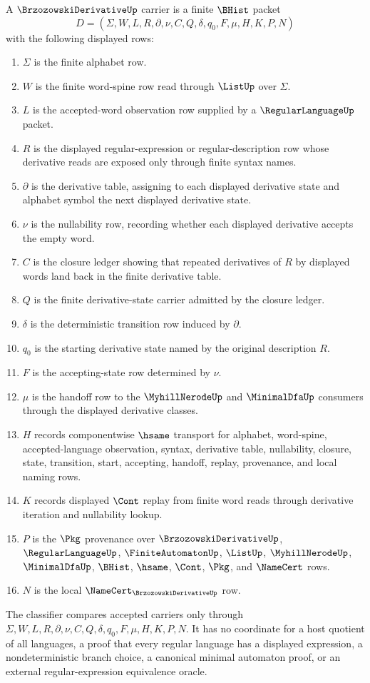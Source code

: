 \begin{definition}
\label{def:brzozowski-derivative-carrier}
A $\BrzozowskiDerivativeUp$ carrier is a finite $\BHist$ packet
$$
D=(\Sigma,W,L,R,\partial,\nu,C,Q,\delta,q_0,F,\mu,H,K,P,N)
$$
with the following displayed rows:
\begin{enumerate}
\item $\Sigma$ is the finite alphabet row.
\item $W$ is the finite word-spine row read through $\ListUp$ over $\Sigma$.
\item $L$ is the accepted-word observation row supplied by a $\RegularLanguageUp$ packet.
\item $R$ is the displayed regular-expression or regular-description row whose derivative reads are exposed only through finite syntax names.
\item $\partial$ is the derivative table, assigning to each displayed derivative state and alphabet symbol the next displayed derivative state.
\item $\nu$ is the nullability row, recording whether each displayed derivative accepts the empty word.
\item $C$ is the closure ledger showing that repeated derivatives of $R$ by displayed words land back in the finite derivative table.
\item $Q$ is the finite derivative-state carrier admitted by the closure ledger.
\item $\delta$ is the deterministic transition row induced by $\partial$.
\item $q_0$ is the starting derivative state named by the original description $R$.
\item $F$ is the accepting-state row determined by $\nu$.
\item $\mu$ is the handoff row to the $\MyhillNerodeUp$ and $\MinimalDfaUp$ consumers through the displayed derivative classes.
\item $H$ records componentwise $\hsame$ transport for alphabet, word-spine, accepted-language observation, syntax, derivative table, nullability, closure, state, transition, start, accepting, handoff, replay, provenance, and local naming rows.
\item $K$ records displayed $\Cont$ replay from finite word reads through derivative iteration and nullability lookup.
\item $P$ is the $\Pkg$ provenance over $\BrzozowskiDerivativeUp$, $\RegularLanguageUp$, $\FiniteAutomatonUp$, $\ListUp$, $\MyhillNerodeUp$, $\MinimalDfaUp$, $\BHist$, $\hsame$, $\Cont$, $\Pkg$, and $\NameCert$ rows.
\item $N$ is the local $\NameCert_{\BrzozowskiDerivativeUp}$ row.
\end{enumerate}
The classifier compares accepted carriers only through $\Sigma,W,L,R,\partial,\nu,C,Q,\delta,q_0,F,\mu,H,K,P,N$. It has no coordinate for a host quotient of all languages, a proof that every regular language has a displayed expression, a nondeterministic branch choice, a canonical minimal automaton proof, or an external regular-expression equivalence oracle.
\end{definition}

